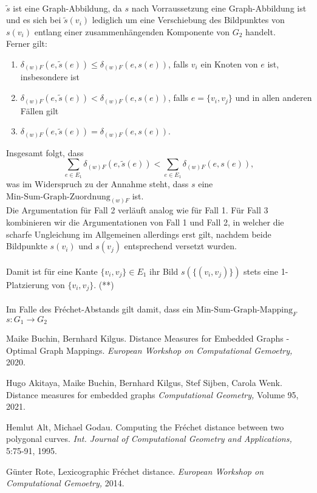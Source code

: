 \documentclass[a4paper, 12pt, twoside]{article}
\theoremstyle{Format1} %
\begin{document}
\\
$\tilde{s}$ ist eine Graph-Abbildung, da $s$ nach Vorraussetzung eine Graph-Abbildung ist und es sich bei $\tilde{s}(v_i)$ lediglich um eine Verschiebung
des Bildpunktes von $s(v_i)$ entlang einer zusammenhängenden Komponente von $G_2$ handelt.
\\
Ferner gilt:
\begin{enumerate}
	\item[] $\delta_{(w)F}(e, \tilde{s}(e)) \leq \delta_{(w)F}(e, s(e))$, falls $v_i$ ein Knoten von $e$ ist, insbesondere ist
	\item[] $\delta_{(w)F}(e, \tilde{s}(e)) < \delta_{(w)F}(e, s(e))$, falls $e = \{v_i, v_j\}$ und in allen anderen Fällen gilt
	\item[] $\delta_{(w)F}(e, \tilde{s}(e)) = \delta_{(w)F}(e, s(e))$.
\end{enumerate}
Insgesamt folgt, dass
$$\sum_{{e}\in E_1} \delta_{(w)F}(e, \tilde{s}(e)) < \sum_{{e}\in E_1} \delta_{(w)F}(e, s(e)),$$
was im Widerspruch zu der Annahme steht, dass $s$ eine $\text{Min-Sum-Graph-Zuordnung}_{(w)F}$ ist.
\\
Die Argumentation für Fall 2 verläuft analog wie für Fall 1.
Für Fall 3 kombinieren wir die Argumentationen von Fall 1 und Fall 2, in welcher die scharfe Ungleichung im Allgemeinen allerdings erst gilt,
nachdem beide Bildpunkte $s(v_i)$ und $s(v_j)$ entsprechend versetzt wurden.
\\
\\
Damit ist für eine Kante $\{v_i, v_j\} \in E_1$ ihr Bild $s(\{(v_i, v_j)\})$ stets eine 1-Platzierung von $\{v_i, v_j\}$. (**)
\\
\\
Im Falle des Fréchet-Abstands gilt damit, dass ein $\text{Min-Sum-Graph-Mapping}_F$ $s: G_1 \to G_2$



\newpage\null\thispagestyle{empty}\newpage

\begin{thebibliography}{4}
		Maike Buchin, Bernhard Kilgus. Distance Measures for Embedded Graphs - Optimal Graph Mappings.
		\textit{European Workshop on Computational Gemoetry,} 2020.

		Hugo Akitaya, Maike Buchin, Bernhard Kilgus, Stef Sijben, Carola Wenk. Distance measures for embedded graphs
		\textit{Computational Geometry,} Volume 95, 2021.

		Hemlut Alt, Michael Godau. Computing the Fréchet distance between two polygonal curves.
		\textit{Int. Journal of Computational Geometry and Applications,} 5:75-91, 1995.

		Günter Rote, Lexicographic Fréchet distance.
		\textit{European Workshop on Computational Gemoetry,} 2014.

\end{thebibliography}


\end{document}
